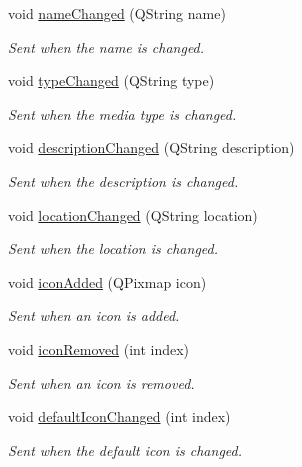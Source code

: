 \begin{DoxyCompactItemize}
\item 
void \hyperlink{class_a_w_e_1_1_media_item_abb9c8990c7bd1b8e8b9a1556f62642fd}{name\-Changed} (Q\-String name)
\begin{DoxyCompactList}\small\item\em Sent when the name is changed. \end{DoxyCompactList}\item 
void \hyperlink{class_a_w_e_1_1_media_item_a13fdd406dbfcf3605f1db86f0a7278a7}{type\-Changed} (Q\-String type)
\begin{DoxyCompactList}\small\item\em Sent when the media type is changed. \end{DoxyCompactList}\item 
void \hyperlink{class_a_w_e_1_1_media_item_a14df1b217aa2758283f66e5d9da1a456}{description\-Changed} (Q\-String description)
\begin{DoxyCompactList}\small\item\em Sent when the description is changed. \end{DoxyCompactList}\item 
void \hyperlink{class_a_w_e_1_1_media_item_a4ea27584e2fcf2ff4781aa5a87f8e26a}{location\-Changed} (Q\-String location)
\begin{DoxyCompactList}\small\item\em Sent when the location is changed. \end{DoxyCompactList}\item 
void \hyperlink{class_a_w_e_1_1_media_item_af345d35f4f380c0cf7eb02eeb883848f}{icon\-Added} (Q\-Pixmap icon)
\begin{DoxyCompactList}\small\item\em Sent when an icon is added. \end{DoxyCompactList}\item 
void \hyperlink{class_a_w_e_1_1_media_item_a76f8f85b2d93c145220fcfe2ef93fab9}{icon\-Removed} (int index)
\begin{DoxyCompactList}\small\item\em Sent when an icon is removed. \end{DoxyCompactList}\item 
void \hyperlink{class_a_w_e_1_1_media_item_a099f9a63a70d0a0f1433c737aee0768a}{default\-Icon\-Changed} (int index)
\begin{DoxyCompactList}\small\item\em Sent when the default icon is changed. \end{DoxyCompactList}\item 

\end{DoxyCompactItemize}
